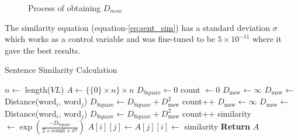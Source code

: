 \begin{figure}
    \centering
    
    \caption{Process of obtaining $D_{msw}$}
    \label{fig:msd}
\end{figure}

The similarity equation (equation-\ref{eq:sent_sim}) has a standard deviation $\sigma$ which works
as a control variable and was fine-tuned to be $5 \times 10^{-11}$ where it gave the best results.

\begin{algorithm} \caption{Sentence Similarity Calculation} \label{alg:similarity}
\begin{algorithmic}[1]
    \State $n \gets$ length($VL$)
    \State $A \gets \{ \{0\} \times n \} \times n$
        \State $D_{\text{Square}} \gets 0$
        \State count $\gets 0$
                \State $D_{\text{msw}} \gets \infty$
                        \State $D_{\text{msw}} \gets$ Distance(word$_i$, word$_j$)
                    \EndIf
                \EndFor
                \State $D_{\text{Square}} \gets D_{\text{Square}} + D_{\text{msw}}^2$
                \State count++
            \EndFor
                \State $D_{\text{msw}} \gets \infty$
                        \State $D_{\text{msw}} \gets$ Distance(word$_i$, word$_j$)
                    \EndIf
                \EndFor
                \State $D_{\text{Square}} \gets D_{\text{Square}} + D_{\text{msw}}^2$
                \State count++
            \EndFor
            \State similarity $\gets \exp \left( \frac{- D_{\text{Square}}}{2 \times \text{count} \times \sigma^2} \right)$
            \State $A[i][j] \gets A[j][i] \gets$ similarity
        \EndFor
    \EndFor
    \State \textbf{Return} $A$
\end{algorithmic}
\end{algorithm}
